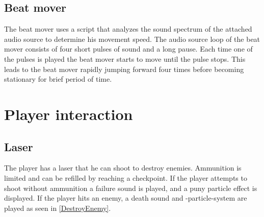 \subsection{Beat mover}
The beat mover uses a script that analyzes the sound spectrum of the attached audio source to determine his movement speed. The audio source loop of the beat mover consists of four short pulses of sound and a long pause. Each time one of the pulses is played the beat mover starts to move until the pulse stops. This leads to the beat mover rapidly jumping forward four times before becoming stationary for brief period of time.



\section{Player interaction}
\subsection{Laser}
The player has a laser that he can shoot to destroy enemies. Ammunition is limited and can be refilled by reaching a checkpoint. If the player attempts to shoot without ammunition a failure sound is played, and a puny particle effect is displayed. If the player hits an enemy, a death sound and -particle-system are played as seen in \cref{DestroyEnemy}.

